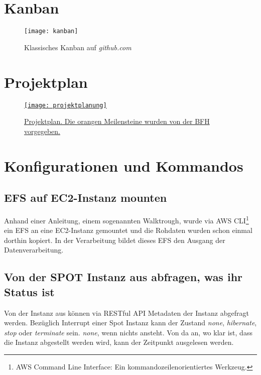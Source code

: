 \section{Kanban}\label{appendix:kanban}
\begin{figure}[H]
	\centering
	\texttt{[image: kanban]}
	\caption{Klassisches Kanban auf \emph{github.com}}
	\label{fig:Klassisches Kanban}
\end{figure}

\section{Projektplan}\label{appendix:projektplan}
\begin{figure}[H]
	\centering
	\href{https://docs.google.com/spreadsheets/d/1zKTZgt4BW736G0xRfU9o3vWYwAJj-8nzFvGsPR7yJ_0/edit?usp=sharing}{
	\texttt{[image: projektplanung]}}
	\caption{\href{https://docs.google.com/spreadsheets/d/1zKTZgt4BW736G0xRfU9o3vWYwAJj-8nzFvGsPR7yJ_0/edit?usp=sharing}{Projektplan. Die orangen Meilensteine wurden von der BFH vorgegeben.}}
	\label{fig:Projektplan}
\end{figure}

\section{Konfigurationen und Kommandos}
\subsection{EFS auf EC2-Instanz mounten}
Anhand einer Anleitung, einem sogenannten Walktrough, wurde via AWS CLI\footnote{AWS Command Line Interface: Ein kommandozeilenorientiertes Werkzeug.} ein
EFS an eine EC2-Instanz gemountet und die Rohdaten wurden schon einmal dorthin kopiert. In der Verarbeitung bildet dieses EFS den Ausgang der Datenverarbeitung.


\subsection{Von der SPOT Instanz aus abfragen, was ihr Status ist}\label{appendix:restful}
Von der Instanz aus können via RESTful API Metadaten der Instanz abgefragt werden. Bezüglich Interrupt einer Spot Instanz kann der Zustand \emph{none}, \emph{hibernate}, \emph{stop} oder \emph{terminate} sein. \emph{none}, wenn nichts ansteht. Von da an, wo klar ist, dass die Instanz abgestellt werden wird, kann der Zeitpunkt ausgelesen werden.

